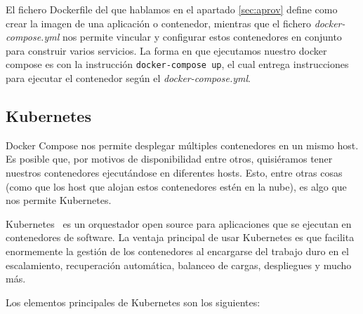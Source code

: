 	El fichero Dockerfile del que hablamos en el apartado \ref{sec:aprov} define como crear la imagen de una aplicación o contenedor, mientras que el fichero \textit{docker-compose.yml} nos permite vincular y configurar estos contenedores en conjunto para construir varios servicios. La forma en que ejecutamos nuestro docker compose es con la instrucción \texttt{docker-compose up}, el cual entrega instrucciones para ejecutar el contenedor según el \textit{docker-compose.yml}.

\subsection{Kubernetes}
	Docker Compose nos permite desplegar múltiples contenedores en un mismo host. Es posible que, por motivos de disponibilidad entre otros, quisiéramos tener nuestros contenedores ejecutándose en diferentes hosts. Esto, entre otras cosas (como que los host que alojan estos contenedores estén en la nube), es algo que nos permite Kubernetes.

	Kubernetes~\cite{orq3} es un orquestador open source para aplicaciones que se ejecutan en contenedores de software. La ventaja principal de usar Kubernetes es que facilita enormemente la gestión de los contenedores al encargarse del trabajo duro en el escalamiento, recuperación automática, balanceo de cargas, despliegues y mucho más. 



	Los elementos principales de Kubernetes son los siguientes:

